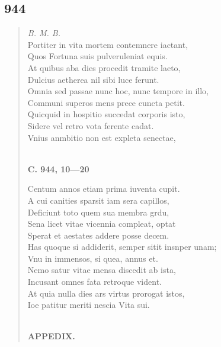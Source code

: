 \documentclass[11pt, a4paper]{report}
\begin{document}
            \subsection*{944}
      \begin{verse}
      \textit{B. M. B.} \\ Portiter in vita mortem contemnere iactant, \\ Quos Fortuna suis pulveruleniat equis. \\ At quibus aba dies procedit tramite laeto, \\ Dulcius aetherea nil sibi luce ferunt. \\ Omnia sed passae nunc hoc, nunc tempore in illo, \\ Communi superos mens prece cuncta petit. \\ Quicquid in hospitio succedat corporis isto, \\ Sidere vel retro vota ferente cadat. \\ Vnius anmbitio non est expleta senectae, \\ 
        ﻿\pagebreak 
     \marginpar{[366]} \begin{center} \textbf{C. 944, 10—20} \end{center}Centum annos etiam prima iuventa cupit. \\ A cui canities sparsit iam sera capillos, \\ Deficiunt toto quem sua membra grdu, \\ Sena licet vitae vicennia compleat, optat \\ Sperat et aestates addere posse decem. \\ Has quoque si addiderit, semper sitit insnper unam; \\ Vnu in immensos, si quea, annus et. \\ Nemo satur vitae mensa discedit ab ista, \\ Incusant omnes fata retroque vident. \\ At quia nulla dies ars virtus prorogat istos, \\ Ioe patitur meriti nescia Vita sui. \\ 
        ﻿\pagebreak 
    \begin{center} \textbf{APPEDIX.} \end{center}
      \end{verse}
  
\end{document}
